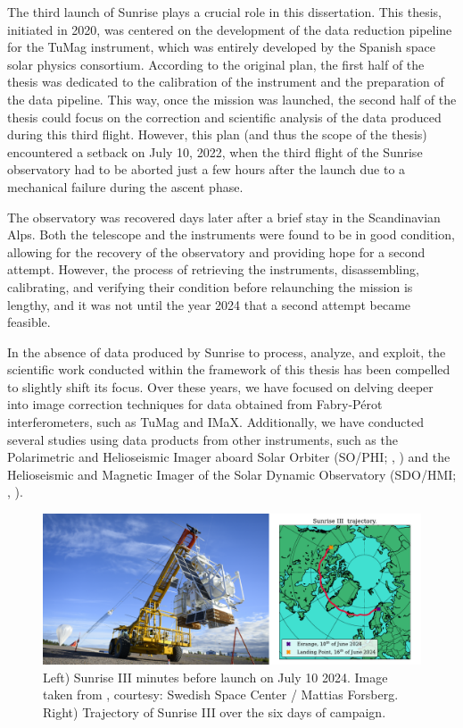 The third launch of Sunrise plays a crucial role in this dissertation. This thesis, initiated in 2020, was centered on the development of the data reduction pipeline for the TuMag instrument, which was entirely developed by the Spanish space solar physics consortium. According to the original plan, the first half of the thesis was dedicated to the calibration of the instrument and the preparation of the data pipeline. This way, once the mission was launched, the second half of the thesis could focus on the correction and scientific analysis of the data produced during this third flight. However, this plan (and thus the scope of the thesis) encountered a setback on July 10, 2022, when the third flight of the Sunrise observatory had to be aborted just a few hours after the launch due to a mechanical failure during the ascent phase.

The observatory was recovered days later after a brief stay in the Scandinavian Alps. Both the telescope and the instruments were found to be in good condition, allowing for the recovery of the observatory and providing hope for a second attempt. However, the process of retrieving the instruments, disassembling, calibrating, and verifying their condition before relaunching the mission is lengthy, and it was not until the year 2024 that a second attempt became feasible.

In the absence of data produced by Sunrise to process, analyze, and exploit, the scientific work conducted within the framework of this thesis has been compelled to slightly shift its focus. Over these years, we have focused on delving deeper into image correction techniques for data obtained from Fabry-Pérot interferometers, such as TuMag and IMaX. Additionally, we have conducted several studies using data products from other instruments, such as the Polarimetric and Helioseismic Imager aboard Solar Orbiter (SO/PHI; \citealt{PHI}, \citealt{SO}) and the Helioseismic and Magnetic Imager of the Solar Dynamic Observatory (SDO/HMI; \citealt{hmi1}, \citealt{SDO}).

\begin{figure}[t]
  \centering
  \includegraphics[width = \textwidth]{figures/Introduction/Sunrise.pdf}
  \caption[Sunrise III and its trajectory]{Left) Sunrise III minutes before launch on July 10 2024. Image taken from \cite{SunriseIII}, courtesy: Swedish Space Center / Mattias Forsberg. Right) Trajectory of Sunrise III over the six days of campaign.} 
  \label{fig_intro: sunrise_trajectory}
\end{figure}

